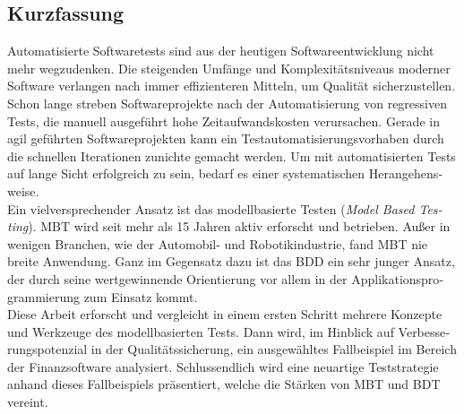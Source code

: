 
\cleardoublepage
{}


\begin{otherlanguage}{ngerman}

\chapter*{Kurzfassung}

Automatisierte Softwaretests sind aus der heutigen Softwareentwicklung nicht mehr wegzudenken. Die steigenden Umfänge und Komplexitätsniveaus moderner Software verlangen nach immer effizienteren Mitteln, um Qualität sicherzustellen. Schon lange streben Softwareprojekte nach der Automatisierung von regressiven Tests, die manuell ausgeführt hohe Zeitaufwandskosten verursachen. Gerade in agil geführten Softwareprojekten kann ein Testautomatisierungsvorhaben durch die schnellen Iterationen zunichte gemacht werden. Um mit automatisierten Tests auf lange Sicht erfolgreich zu sein, bedarf es einer systematischen Herangehensweise.\\

Ein vielversprechender Ansatz ist das modellbasierte Testen (\textit{Model Based Testing}). \Gls{MBT} wird seit mehr als 15 Jahren aktiv erforscht und betrieben. Außer in wenigen Branchen, wie der Automobil- und Robotikindustrie, fand \Gls{MBT} nie breite Anwendung. Ganz im Gegensatz dazu ist das \Gls{BDD} ein sehr junger Ansatz, der durch seine wertgewinnende Orientierung vor allem in der Applikationsprogrammierung zum Einsatz kommt.\\

Diese Arbeit erforscht und vergleicht in einem ersten Schritt mehrere Konzepte und Werkzeuge des modellbasierten Tests. Dann wird, im Hinblick auf Verbesserungspotenzial in der Qualitätssicherung, ein ausgewähltes Fallbeispiel im Bereich der Finanzsoftware analysiert. Schlussendlich wird eine neuartige Teststrategie anhand dieses Fallbeispiels präsentiert, welche die Stärken von \Gls{MBT} und \Gls{BDT} vereint. \\


\end{otherlanguage}
